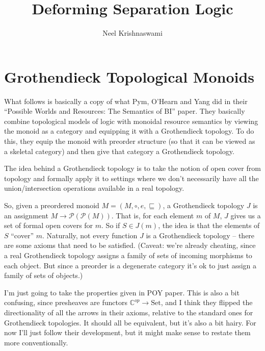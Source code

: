 \documentclass{article}
\title{Deforming Separation Logic}
\author{Neel Krishnaswami}
\newcommand{\powerset}[1]{\mathcal{P}(#1)}
\begin{document}
\maketitle

\section{Grothendieck Topological Monoids}

What follows is basically a copy of what Pym, O'Hearn and Yang did in their ``Possible Worlds
and Resources: The Semantics of BI'' paper. They basically combine topological models of 
logic with monoidal resource semantics by viewing the monoid as a category and equipping it 
with a Grothendieck topology. To do this, they equip the monoid with preorder structure
(so that it can be viewed as a skeletal category) and then give that category a Grothendieck
topology. 

The idea behind a Grothendieck topology is to take the notion of open
cover from topology and formally apply it to settings where we don't
necessarily have all the union/intersection operations available in a
real topology.

So, given a preordered monoid $M = (M, \circ, e, \sqsubseteq)$, a
Grothendieck topology $J$ is an assignment $M \to
\powerset{\powerset{M}}$. That is, for each element $m$ of $M$, $J$ gives us 
a set of formal open covers for $m$. So if $S \in J(m)$, the idea is that
the elements of $S$ ``cover'' $m$. Naturally, not every function $J$ is
a Grothendieck topology -- there are some axioms that need to be satisfied. 
(Caveat: we're already cheating, since a real Grothendieck topology assigns
a family of sets of incoming morphisms to each object. But since a preorder
is a degenerate category it's ok to just assign a family of sets of objects.)

I'm just going to take the properties given in POY paper. This is also a bit
confusing, since presheaves are functors $\mathbb{C}^{op} \to \mathrm{Set}$, and
I think they flipped the directionality of all the arrows in their axioms, relative 
to the standard ones for Grothendieck topologies. It should all be equivalent,
but it's also a bit hairy. For now I'll just follow their development, but it
might make sense to restate them more conventionally. 
\end{document}
